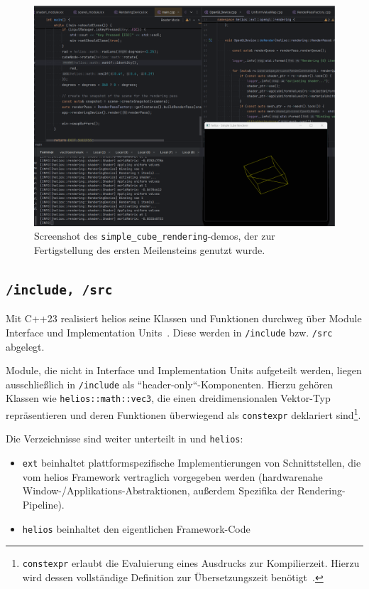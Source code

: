 \begin{figure}[!h]
    \centering
    \includegraphics[width=1\columnwidth]{img/cube_example}
    \caption{Screenshot des \texttt{simple\_cube\_rendering}-demos, der zur Fertigstellung des ersten Meilensteins genutzt wurde.}
    \label{fig:simple-cube-rendering-demo}
\end{figure}

\subsection*{\texttt{/include, /src}}
Mit C++23 realisiert helios seine Klassen und Funktionen durchweg über Module Interface und Implementation Units~\cite[211 f.]{Str24}. Diese werden in \texttt{/include} bzw. \texttt{/src} abgelegt.\par
Module, die nicht in Interface und Implementation Units aufgeteilt werden, liegen ausschließlich in \texttt{/include} als ``header-only``-Komponenten.
Hierzu gehören Klassen wie \texttt{helios::math::vec3}, die einen dreidimensionalen Vektor-Typ repräsentieren und deren Funktionen überwiegend als \texttt{constexpr} deklariert sind\footnote{
    \texttt{constexpr} erlaubt die Evaluierung eines Ausdrucks zur Kompilierzeit. Hierzu wird dessen vollständige Definition zur Übersetzungszeit benötigt~\cite[330 f.]{Gre24}.
}.\par
Die Verzeichnisse sind weiter unterteilt in  und \texttt{helios}:
\begin{itemize}
    \itemsep0.5em
    \item \texttt{ext} beinhaltet plattformspezifische Implementierungen von Schnittstellen, die vom helios Framework vertraglich vorgegeben werden (hardwarenahe Window-/Applikations-Abstraktionen, außerdem Spezifika der Rendering-Pipeline).
    \item \texttt{helios} beinhaltet den eigentlichen Framework-Code
\end{itemize}
